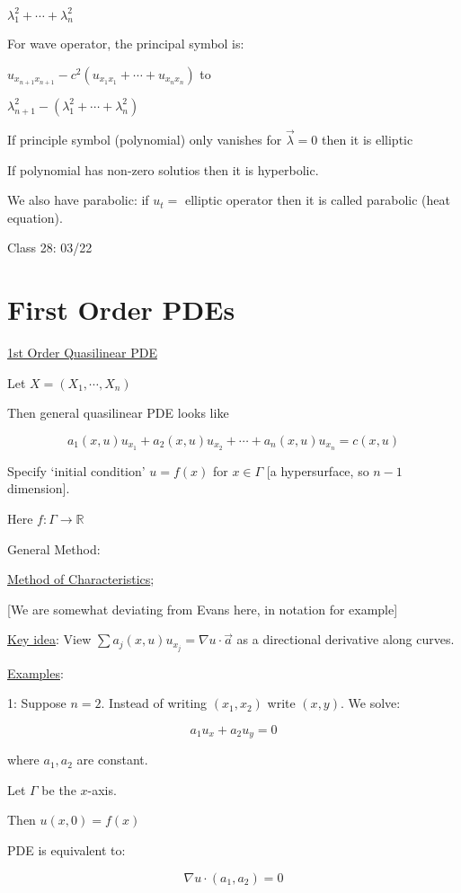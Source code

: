 \documentclass{article}
\theoremstyle{definition}
\begin{document}
\(\lambda_1^2 + \cdots + \lambda_n^2\) 

For wave operator, the principal symbol is:

\(u_{x_{n+1} x_{n+1}} - c^2 (u_{x_1 x_1} + \cdots + u_{x_n x_n})\) to

\(\lambda_{n+1}^2 - (\lambda_1^2 + \cdots + \lambda_n^2)\) 

If principle symbol (polynomial) only vanishes for \(\vec{\lambda} = 0\) then it is elliptic

If polynomial has non-zero solutios then it is hyperbolic.

We also have parabolic: if \(u_t =\) elliptic operator then it is called parabolic (heat equation).

\hrulefill

Class 28: 03/22

\section*{First Order PDEs}

\underline{1st Order Quasilinear PDE} 

Let \(X = (X_1,\cdots,X_n)\)

Then general quasilinear PDE looks like

\[
    a_1(x,u)u_{x_1}+a_2(x,u)u_{x_2}+\cdots+a_n(x,u)u_{x_n} = c(x,u)
\]

Specify `initial condition' \(u=f(x)\) for \(x\in \Gamma\) [a hypersurface, so \(n-1\) dimension].

Here \(f:\Gamma \to \mathbb{R}\) 

General Method:

\underline{Method of Characteristics};

[We are somewhat deviating from Evans here, in notation for example]

\underline{Key idea}: View \(\sum a_j (x,u) u_{x_j} = \nabla u \cdot \vec{a}\) as a directional derivative along curves.

\underline{Examples}:

1: Suppose \(n = 2\). Instead of writing \((x_1,x_2)\) write \((x,y)\). We solve:

\[
    a_1 u_x + a_2 u_y = 0
\]

where \(a_1,a_2\) are constant.

Let \(\Gamma\) be the \(x\)-axis.

Then \(u(x,0)=f(x)\)

PDE is equivalent to:

\[
    \nabla u\cdot (a_1,a_2) = 0
\]
\end{document}
